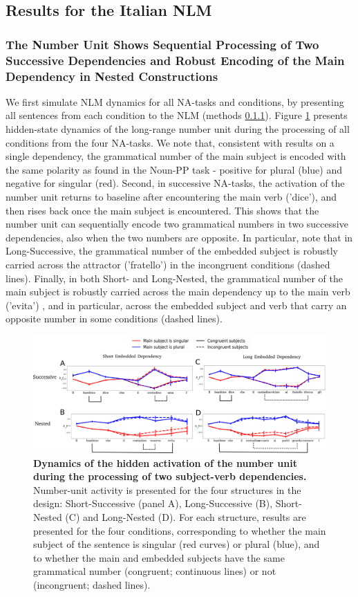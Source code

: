 \subsection{Results for the Italian NLM}
\subsubsection{The Number Unit Shows Sequential Processing of Two Successive Dependencies and Robust Encoding of the Main Dependency in Nested Constructions}
We first simulate NLM dynamics for all NA-tasks and conditions, by presenting all sentences from each condition to the NLM (methods \ref{}). Figure \ref{fig:2by2_dynamics} presents hidden-state dynamics of the long-range number unit during the processing of all conditions from the four NA-tasks. We note that, consistent with results on a single dependency, the grammatical number of the main subject is encoded with the same polarity as found in the Noun-PP task - positive for plural (blue) and negative for singular (red). Second, in successive NA-tasks, the activation of the number unit returns to baseline after encountering the main verb ('dice'), and then rises back once the main subject is encountered. This shows that the number unit can sequentially encode two grammatical numbers in two successive dependencies, also when the two numbers are opposite. In particular, note that in Long-Successive, the grammatical number of the embedded subject is robustly carried across the attractor ('fratello') in the incongruent conditions (dashed lines). Finally, in both Short- and Long-Nested, the grammatical number of the main subject is robustly carried across the main dependency up to the main verb ('evita') , and in particular, across the embedded subject and verb that carry an opposite number in some conditions (dashed lines).

\begin{figure}
    \centering
    \includegraphics[width=\textwidth]{figures/model_activations.png}
    \caption{\textbf{Dynamics of the hidden activation of the number unit during the processing of two subject-verb dependencies.} Number-unit activity is presented for the four structures in the design: Short-Successive (panel A), Long-Successive (B), Short-Nested (C) and Long-Nested (D). For each structure, results are presented for the four conditions, corresponding to whether the main subject of the sentence is singular (red curves) or plural (blue), and to whether the main and embedded subjects have the same grammatical number (congruent; continuous lines) or not (incongruent; dashed lines).}
    \label{fig:2by2_dynamics}
\end{figure}


